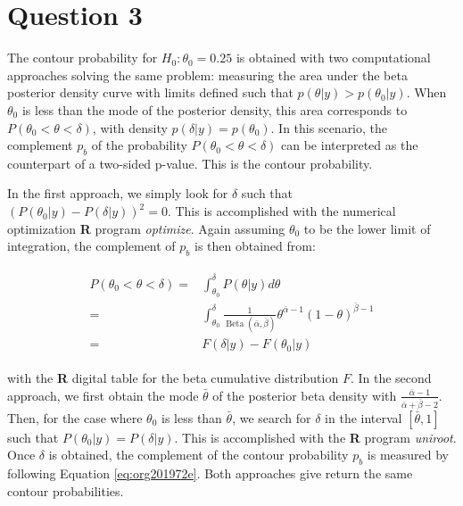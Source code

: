 \documentclass[11pt]{article}
\author{Marc-André Chénier}
\date{\today}
\title{}
\begin{document}
\tableofcontents


\section{Question 3}
\label{sec:org2addb33}
The contour probability for \(H_{0}:\theta_{0}=0.25\) is obtained with
two computational approaches solving the same problem: measuring the
area under the beta posterior density curve with limits defined such
that \(p(\theta|y) > p(\theta_{0}|y)\). When \(\theta_{\text{0}}\) is less than the
mode of the posterior density, this area corresponds to \(P(\theta_{0}
< \theta < \delta)\), with density \(p(\delta | y)=p(\theta_{0})\). In this
scenario, the complement \(p_{b}\) of the probability \(P(\theta_{0} <
\theta < \delta)\) can be interpreted as the counterpart of a two-sided
p-value. This is the contour probability.

In the first approach, we simply look for \(\delta\) such that
\((P(\theta_0|y) - P(\delta|y))^2=0\). This is accomplished with the
numerical optimization \textbf{R} program \emph{optimize}. Again assuming
\(\theta_{0}\) to be the lower limit of integration, the complement of
\(p_{b}\) is then obtained from:

\begin{align}
\label{eq:org201972e}
\begin{split}
P(\theta_{0} < \theta < \delta) =& \int_{\theta_{0}}^{\delta}
P(\theta | y) d\theta \\
=&\int_{\theta_{0}}^{\delta}\frac{1}
{\operatorname{Beta}(\bar{\alpha}, \bar{\beta})} \theta^{\bar{\alpha}-1} 
(1 - \theta)^{\bar{\beta} - 1} \\
=& F(\delta | y) - F(\theta_{0} | y)
\end{split}
\end{align}

with the \textbf{R} digital table for the beta cumulative distribution
\(F\). In the second approach, we first obtain the mode \(\bar{\theta}\)
of the posterior beta density with
\(\frac{\bar{\alpha}-1}{\bar{\alpha} + \bar{\beta}-2}\). Then, for the
case where \(\theta_{0}\) is less than \(\bar{\theta}\), we search for
\(\delta\) in the interval \([\bar{\theta}, 1]\) such that \(P(\theta_{0} |
y)=P(\delta | y)\). This is accomplished with the \textbf{R} program
\emph{uniroot}. Once \(\delta\) is obtained, the complement of the contour
probability \(p_{b}\) is measured by following Equation \ref{eq:org201972e}. Both
approaches give return the same contour probabilities.
\end{document}
